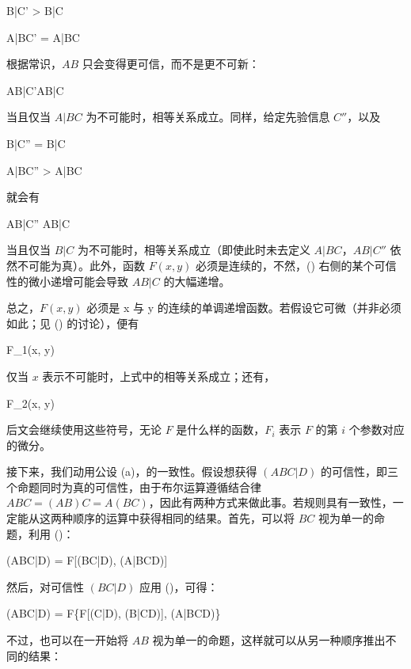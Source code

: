 \placeformula
\startformula
B|C' > B|C
\stopformula

\placeformula
\startformula
A|BC' = A|BC
\stopformula

根据常识，$AB$ 只会变得更可信，而不是更不可新：

\placeformula
\startformula
AB|C'\ge AB|C
\stopformula

当且仅当 $A|BC$ 为不可能时，相等关系成立。同样，给定先验信息 $C''$，以及

\placeformula
\startformula
B|C'' = B|C
\stopformula

\placeformula
\startformula
A|BC'' > A|BC
\stopformula

就会有

\placeformula
\startformula
AB|C'' \ge AB|C
\stopformula

当且仅当 $B|C$ 为不可能时，相等关系成立（即使此时未去定义 $A|BC$，$AB|C''$ 依然不可能为真）。此外，函数 $F(x, y)$ 必须是连续的，不然，() 右侧的某个可信性的微小递增可能会导致 $AB|C$ 的大幅递增。

总之，$F(x, y)$ 必须是 x 与 y 的连续的单调递增函数。若假设它可微（并非必须如此；见 (\in[function-eq]) 的讨论），便有

\placeformula
\startformula
F_1(x, y) \equiv {} 
\stopformula

仅当 $x$ 表示不可能时，上式中的相等关系成立；还有，

\placeformula
\startformula
F_2(x, y) \equiv {} 
\stopformula
\stopsubformulas


后文会继续使用这些符号，无论 $F$ 是什么样的函数，$F_i$ 表示 $F$ 的第 $i$ 个参数对应的微分。

接下来，我们动用公设 (a)，的一致性。假设想获得 $(ABC|D)$ 的可信性，即三个命题同时为真的可信性，由于布尔运算遵循结合律 $ABC = (AB)C = A(BC)$，因此有两种方式来做此事。若规则具有一致性，一定能从这两种顺序的运算中获得相同的结果。首先，可以将 $BC$ 视为单一的命题，利用 ()：


\placeformula
\startformula
(ABC|D) = F[(BC|D), (A|BCD)]
\stopformula

然后，对可信性 $(BC|D)$ 应用 ()，可得：

\placeformula[subeq:1]
\startformula
(ABC|D) = F\{F[(C|D), (B|CD)], (A|BCD)\}
\stopformula

不过，也可以在一开始将 $AB$ 视为单一的命题，这样就可以从另一种顺序推出不同的结果：

